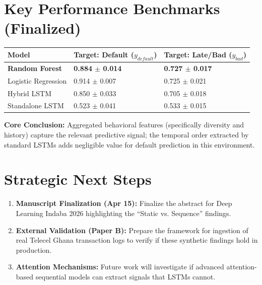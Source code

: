 \documentclass[11pt]{article}
\begin{document}
\section{Key Performance Benchmarks (Finalized)}
\begin{table}[h]
\centering
\begin{tabular}{@{}lll@{}}
\toprule
\textbf{Model} & \textbf{Target: Default ($y_{default}$)} & \textbf{Target: Late/Bad ($y_{bad}$)} \\ \midrule
\textbf{Random Forest} & \textbf{0.884 $\pm$ 0.014} & \textbf{0.727 $\pm$ 0.017} \\
Logistic Regression & 0.914 $\pm$ 0.007 & 0.725 $\pm$ 0.021 \\
Hybrid LSTM & 0.850 $\pm$ 0.033 & 0.705 $\pm$ 0.018 \\
Standalone LSTM & 0.523 $\pm$ 0.041 & 0.533 $\pm$ 0.015 \\ \bottomrule
\end{tabular}
\end{table}

\textbf{Core Conclusion:} Aggregated behavioral features (specifically diversity and history) capture the relevant predictive signal; the temporal order extracted by standard LSTMs adds negligible value for default prediction in this environment.

\section{Strategic Next Steps}
\begin{enumerate}
    \item \textbf{Manuscript Finalization (Apr 15):} Finalize the abstract for Deep Learning Indaba 2026 highlighting the ``Static vs. Sequence'' findings.
    \item \textbf{External Validation (Paper B):} Prepare the framework for ingestion of real Telecel Ghana transaction logs to verify if these synthetic findings hold in production.
    \item \textbf{Attention Mechanisms:} Future work will investigate if advanced attention-based sequential models can extract signals that LSTMs cannot.
\end{enumerate}
\end{document}
